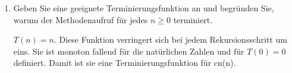 \documentclass{lehramt-informatik-aufgabe}
\begin{document}
\begin{enumerate}
\begin{liAntwort}
\end{liAntwort}


\item Geben Sie eine geeignete Terminierungsfunktion an und begründen
Sie, warum der Methodenaufruf  für jedes $n \geq 0$
terminiert.

\begin{liAntwort}
$T(n) = n$. Diese Funktion verringert sich bei jedem Rekursionsschritt
um eins. Sie ist monoton fallend für die natürlichen Zahlen und für
$T(0) = 0$ definiert. Damit ist sie eine Terminierungsfunktion für
cn(n).
\end{liAntwort}

\end{enumerate}
\end{document}
